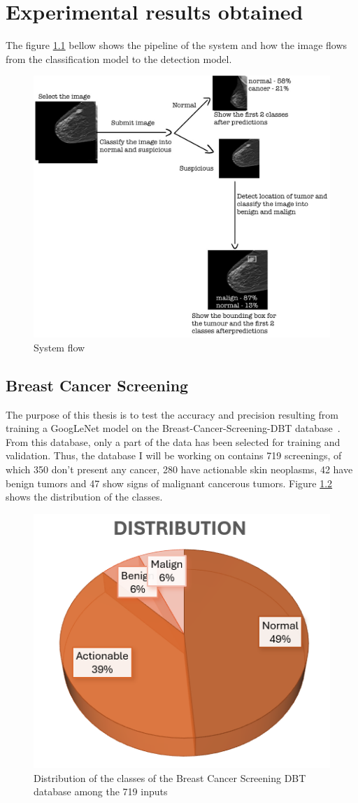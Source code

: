 \chapter{Experimental results obtained}
\label{chap:ch4}

The figure \ref{fig:fig33} bellow shows the pipeline of the system and how the image flows from the classification model to the detection model.

\begin{figure}[H]
    \centering
    \includegraphics[width=0.7\linewidth]{figures/Figure38.png}
    \caption{System flow}
    \label{fig:fig33}
\end{figure}

\section{Breast Cancer Screening}

The purpose of this thesis is to test the accuracy and precision resulting from training a GoogLeNet model on the Breast-Cancer-Screening-DBT database~\cite{link4}. From this database, only a part of the data has been selected for training and validation. Thus, the database I will be working on contains 719 screenings, of which 350 don't present any cancer, 280 have actionable skin neoplasms, 42 have benign tumors and 47 show signs of malignant cancerous tumors. Figure \ref{fig:fig30} shows the distribution of the classes.

\begin{figure}[hb!]
    \centering
    \includegraphics[width=0.5\linewidth]{figures/Figure36.png}
    \caption{Distribution of the classes of the Breast Cancer Screening DBT database among the 719 inputs}
    \label{fig:fig30}
\end{figure}


